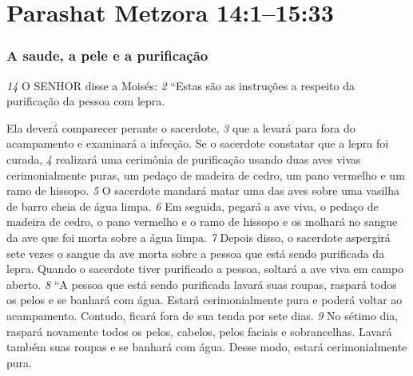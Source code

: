 \section*{Parashat Metzora 14:1–15:33} 


\subsubsection*{A saude, a pele e a purificação}   
\textit{\tiny 14}
O SENHOR disse a Moisés:    
\textit{\tiny 2} 
“Estas   são as instruções a respeito da
purificação da pessoa com lepra.

\smallskip
 Ela deverá comparecer perante o sacerdote, 
\textit{\tiny 3} 
que a levará para fora do acampamento e examinará a infecção. Se o sacerdote
constatar que a lepra foi curada, 
\textit{\tiny 4} 
realizará uma cerimônia de purificação usando
duas aves vivas cerimonialmente puras, um pedaço de madeira de cedro, um pano
vermelho e um ramo de hissopo. 
\textit{\tiny 5} 
O sacerdote mandará matar uma das aves sobre
uma vasilha de barro cheia de água limpa. 
\textit{\tiny 6} 
Em seguida, pegará a ave viva, o
pedaço de madeira de cedro, o pano vermelho e o ramo de hissopo e os molhará
no sangue da ave que foi morta sobre a água limpa. 
\textit{\tiny 7} 
Depois disso, o sacerdote
aspergirá sete vezes o sangue da ave morta sobre a pessoa que está sendo
purificada da lepra. Quando o sacerdote tiver purificado a pessoa, soltará a ave
viva em campo aberto. 
\textit{\tiny 8} 
“A pessoa que está sendo purificada lavará suas roupas, raspará todos os pelos
e se banhará com água. Estará cerimonialmente pura e poderá voltar ao
acampamento. Contudo, ficará fora de sua tenda por sete dias. 
\textit{\tiny 9} 
No sétimo dia,
raspará novamente todos os pelos, cabelos, pelos faciais e sobrancelhas. Lavará
também suas roupas e se banhará com água. Desse modo, estará cerimonialmente
pura.

